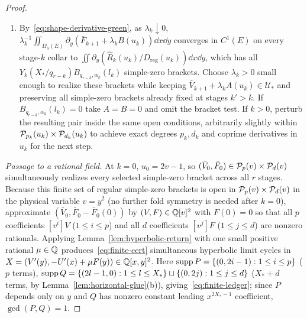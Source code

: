 \begin{proof}
\begin{enumerate}[label=\arabic*.,nosep]
  \item By~\eqref{eq:shape-derivative-green}, as $\lambda_k\downarrow 0$, $\lambda_k^{-1}\iint_{\Omega_\lambda(E)}\partial_y(\bar{F}_{k+1}+\lambda_k B(u_k))\dd x\dd y$ converges in $C^1(E)$ on every stage-$k$ collar to $\iint\partial_y(\widehat{R}_k(u_k)/D_{\mathrm{reg}}(u_k))\dd x\dd y$, which has all $Y_k(X_*/q_{r-k})B_{q_{r-k},\alpha_k}(l_k)$ simple-zero brackets. Choose $\lambda_k>0$ small enough to realize these brackets while keeping $\bar{V}_{k+1}+\lambda_k A(u_k)\in\mathcal{U}_*$ and preserving all simple-zero brackets already fixed at stages $k'>k$. If $B_{q_{r-k},\alpha_k}(l_k)=0$ take $A=B=0$ and omit the bracket test. If $k>0$, perturb the resulting pair inside the same open conditions, arbitrarily slightly within $\mathcal{P}_{p_k}(u_k)\times\mathcal{P}_{d_k}(u_k)$ to achieve exact degrees $p_k,d_k$ and coprime derivatives in $u_k$ for the next step.
\end{enumerate}

\emph{Passage to a rational field.} At $k=0$, $u_0=2v-1$, so $(\bar{V}_0,\bar{F}_0)\in\mathcal{P}_p(v)\times\mathcal{P}_d(v)$ simultaneously realizes every selected simple-zero bracket across all $r$ stages. Because this finite set of regular simple-zero brackets is open in $\mathcal{P}_p(v)\times\mathcal{P}_d(v)$ in the physical variable $v=y^2$ (no further fold symmetry is needed after $k=0$), approximate $(\bar{V}_0,\bar{F}_0-\bar{F}_0(0))$ by $(V,F)\in\mathbb{Q}[v]^2$ with $F(0)=0$ so that all $p$ coefficients $[v^i]V$ ($1\le i\le p$) and all $d$ coefficients $[v^j]F$ ($1\le j\le d$) are nonzero rationals. Applying Lemma~\ref{lem:hyperbolic-return} with one small positive rational $\mu\in\mathbb{Q}$ produces~\eqref{eq:finite-cert} simultaneous hyperbolic limit cycles in $X=(V'(y),-U'(x)+\mu F(y))\in\mathbb{Q}[x,y]^2$. Here $\operatorname{supp} P=\{(0,2i-1):1\le i\le p\}$ ($p$ terms), $\operatorname{supp} Q=\{(2l-1,0):1\le l\le X_*\}\sqcup\{(0,2j):1\le j\le d\}$ ($X_*+d$ terms, by Lemma~\ref{lem:horizontal-glue}(b)), giving~\eqref{eq:finite-ledger}; since $P$ depends only on $y$ and $Q$ has nonzero constant leading $x^{2X_*-1}$ coefficient, $\gcd(P,Q)=1$.
\end{proof}

